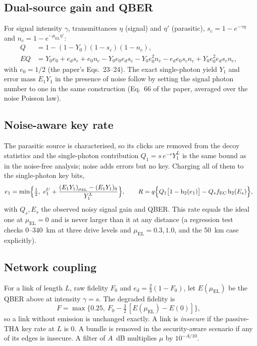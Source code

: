 \documentclass[10pt]{article}
\newcommand{\muEL}{\mu_{\mathrm{EL}}}
\DeclareMathOperator{\hbin}{h_2}
\begin{document}
\subsection*{Dual-source gain and QBER}
For signal intensity $\gamma$, transmittances $\eta$ (signal) and $\eta'$
(parasitic), $s_c=1-e^{-\gamma\eta}$ and $n_c=1-e^{-\muEL\eta'}$:
\begin{align}
Q&=1-(1-Y_0)(1-s_c)(1-n_c),\\
EQ&=Y_0e_0+e_ds_c+e_0n_c-Y_0e_0e_ds_c-Y_0e_0^2n_c-e_de_0s_cn_c
+Y_0e_0^2e_ds_cn_c,
\end{align}
with $e_0=1/2$ (the paper's Eqs.~23--24). The exact single-photon yield $Y_1$ and
error mass $E_1Y_1$ in the presence of noise follow by setting the signal photon
number to one in the same construction (Eq.~66 of the paper, averaged over the
noise Poisson law).

\subsection*{Noise-aware key rate}
The parasitic source is characterised, so its clicks are removed from the decoy
statistics and the single-photon contribution $Q_1=s\,e^{-s}Y_1^L$ is the same
bound as in the noise-free analysis; noise adds errors but no key. Charging all
of them to the single-photon key bits,
\begin{equation}
e_1=\min\Bigl\{\tfrac12,\ e_1^U+\frac{(E_1Y_1)_{\muEL}-(E_1Y_1)_{0}}{Y_1^L}\Bigr\},
\qquad
R=q\Bigl\{Q_1\bigl[1-\hbin(e_1)\bigr]-Q_sf_{\mathrm{EC}}\hbin(E_s)\Bigr\},
\end{equation}
with $Q_s,E_s$ the observed noisy signal gain and QBER. This rate equals the
ideal one at $\muEL=0$ and is never larger than it at any distance (a regression
test checks $0$--$340$~km at three drive levels and $\muEL=0.3,1.0$, and the
50~km case explicitly).

\subsection*{Network coupling}
For a link of length $L$, raw fidelity $F_0$ and $e_d=\tfrac23(1-F_0)$, let
$E(\muEL)$ be the QBER above at intensity $\gamma=s$. The degraded fidelity is
\begin{equation}
F=\max\bigl\{0.25,\ F_0-\tfrac32\,[E(\muEL)-E(0)]\bigr\},
\end{equation}
so a link without emission is unchanged exactly. A link is \emph{insecure} if
the passive-THA key rate at $L$ is $0$. A bundle is removed in the
security-aware scenario if any of its edges is insecure. A filter of $A$~dB
multiplies $\mu$ by $10^{-A/10}$.
\end{document}
